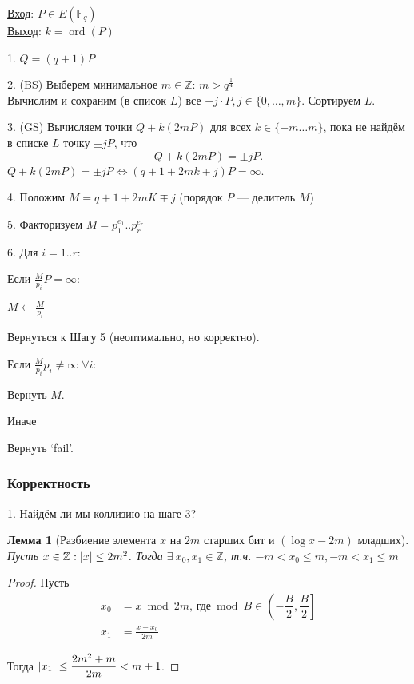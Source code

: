 \documentclass[12pt]{article}
\newcommand{\Z}{{{\mathbb Z}}}
\newcommand{\F}{{{\mathbb F}}}
\DeclarePairedDelimiter{\abs}{\lvert}{\rvert}
\newtheorem{lemma}[theorem]{Лемма}
\theoremstyle{definition}
\theoremstyle{definition}
\theoremstyle{definition}
\begin{document}
\underline{Вход}: $P\in E(\F_q)$\\
\underline{Выход}: $k = \operatorname{ord}(P)$

1. $Q = (q+1)P$

2. (BS) Выберем минимальное $m \in \Z$: $m > q^\frac{1}{4}$\\
Вычислим и сохраним (в список $L$) все $\pm j \cdot P, j \in \{ 0, \ldots,  m\}$. Сортируем $L$.

3. (GS) Вычисляем точки $Q + k(2mP)$ для всех $k \in  \{-m \ldots m\}$, пока не найдём в списке $L$ точку $\pm  jP$, что 
\[
    Q + k(2mP) = \pm  jP.
\]
$Q + k(2mP) = \pm jP \iff (q+1 + 2mk \mp  j)P = \infty$.

4. Положим $M = q+1+2mK \mp  j$ (порядок $P$ — делитель $M$)

5. Факторизуем $M = p_1^{e_1}..p_r^{e_r}$

6. Для $i = 1..r$:


\hspace{20pt} Если $\frac{M}{p_i} P=\infty$:

\hspace{40pt} $M \leftarrow \frac{M}{p_i}$

\hspace{40pt}  Вернуться к Шагу 5 (неоптимально, но корректно). 

Если $\frac{M}{p_i}p_i \neq \infty \; \forall i$:

\quad Вернуть $M$.
 
Иначе

\quad Вернуть `fail'.

\subsubsection{Корректность}

1. Найдём ли мы коллизию на шаге 3?
\begin{lemma}[Разбиение элемента $x$ на $2m$ старших бит и $(\log x - 2m)$ младших]
    Пусть $x \in \Z: \abs{x} \leq 2m^2$. Тогда $\exists \ x_0, x_1 \in \Z$, т.ч. $-m < x_0 \leq m, -m < x_1 \leq m$
\end{lemma}
\begin{proof}
    Пусть
    \begin{align*}
        x_0 &= x \bmod 2m \text{, где} \bmod B \in \left(-\dfrac{B}{2}, \dfrac{B}{2} \right] \\
        x_1 &= \frac{x-x_0}{2m}
    \end{align*}
    
    Тогда $\abs{x_1} \leq \dfrac{2m^2 + m}{2m} < m+1$.
\end{proof}
\end{document}
